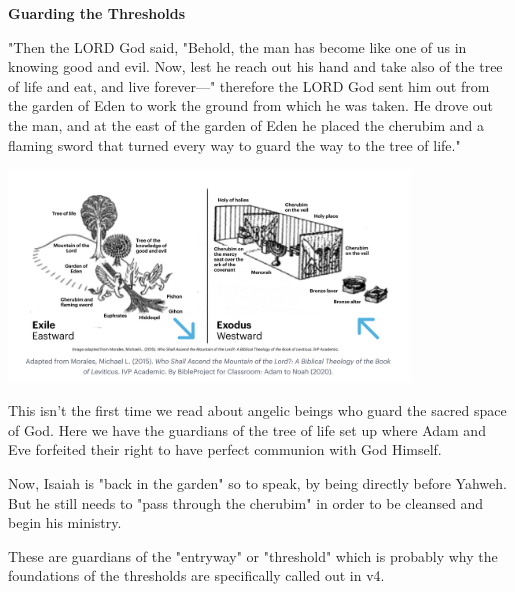 \documentclass[11pt]{article}
\begin{document}
{\vspace{2em}}
{\large\bfseries Guarding the Thresholds}


{\vspace{1em}}


\begin{versesection}{2em}

 "Then the LORD God said, "Behold, the man has become like one of us in knowing good and evil. Now, lest he reach out his hand and take also of the tree of life and eat, and live forever—"  therefore the LORD God sent him out from the garden of Eden to work the ground from which he was taken.  He drove out the man, and at the east of the garden of Eden he placed the cherubim and a flaming sword that turned every way to guard the way to the tree of life."

\end{versesection}


\begin{center}
\includegraphics[width=0.8\textwidth]{eden-temple.png}
\end{center}

{\vspace{2em}}

This isn't the first time we read about angelic beings who guard the sacred space of God. Here we have the guardians of the tree of life set up where Adam and Eve forfeited their right to have perfect communion with God Himself.

Now, Isaiah is "back in the garden" so to speak, by being directly before Yahweh. But he still needs to "pass through the cherubim" in order to be cleansed and begin his ministry.

These are guardians of the "entryway" or "threshold" which is probably why the foundations of the thresholds are specifically called out in v4.
\end{document}
